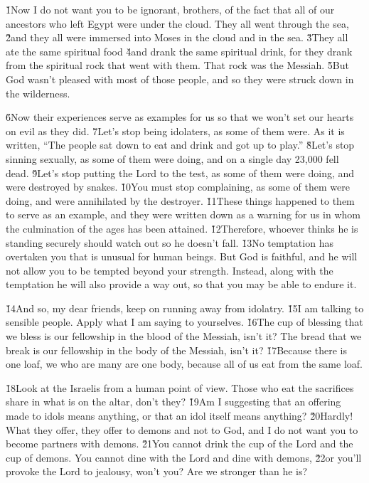 \v{1}Now I do not want you to be ignorant, brothers, of the fact that all of our ancestors who left Egypt were under the cloud. They all went through the sea, \v{2}and they all were immersed into Moses in the cloud and in the sea. \v{3}They all ate the same spiritual food \v{4}and drank the same spiritual drink, for they drank from the spiritual rock that went with them. That rock was the Messiah. \v{5}But God wasn't pleased with most of those people, and so they were struck down in the wilderness.

\v{6}Now their experiences serve as examples for us so that we won't set our hearts on evil as they did. \v{7}Let's stop being idolaters, as some of them were. As it is written, ``The people sat down to eat and drink and got up to play.'' \v{8}Let's stop sinning sexually, as some of them were doing, and on a single day 23,000 fell dead. \v{9}Let's stop putting the Lord to the test, as some of them were doing, and were destroyed by snakes. \v{10}You must stop complaining, as some of them were doing, and were annihilated by the destroyer. \v{11}These things happened to them to serve as an example, and they were written down as a warning for us in whom the culmination of the ages has been attained. \v{12}Therefore, whoever thinks he is standing securely should watch out so he doesn't fall. \v{13}No temptation has overtaken you that is unusual for human beings. But God is faithful, and he will not allow you to be tempted beyond your strength. Instead, along with the temptation he will also provide a way out, so that you may be able to endure it.

\v{14}And so, my dear friends, keep on running away from idolatry. \v{15}I am talking to sensible people. Apply what I am saying to yourselves. \v{16}The cup of blessing that we bless is our fellowship in the blood of the Messiah, isn't it? The bread that we break is our fellowship in the body of the Messiah, isn't it? \v{17}Because there is one loaf, we who are many are one body, because all of us eat from the same loaf.

\v{18}Look at the Israelis from a human point of view. Those who eat the sacrifices share in what is on the altar, don't they? \v{19}Am I suggesting that an offering made to idols means anything, or that an idol itself means anything? \v{20}Hardly! What they offer, they offer to demons and not to God, and I do not want you to become partners with demons. \v{21}You cannot drink the cup of the Lord and the cup of demons. You cannot dine with the Lord and dine with demons, \v{22}or you'll provoke the Lord to jealousy, won't you? Are we stronger than he is?

